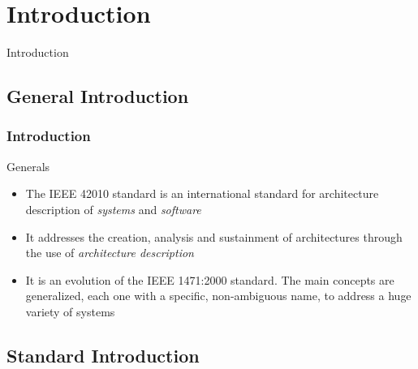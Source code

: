 \footnotesize

\section{Introduction}

	\begin{frame}
		\begin{center}
			\LARGE{Introduction}
		\end{center}
	\end{frame}

	\subsection{General Introduction}
		
		\begin{frame}
			\frametitle{Introduction}	
			\begin{block}{Generals}
				\begin{itemize}\vspace{0.3cm}
					\item The IEEE 42010 standard is an international standard for architecture description of \emph{systems} and \emph{software}\vspace{0.3cm}
					\item It addresses the creation, analysis and sustainment of architectures through the use of \emph{architecture description}\vspace{0.3cm}
					\item It is an evolution of the IEEE 1471:2000 standard. The main concepts are generalized, each one with a specific, non-ambiguous name, to address a huge variety of systems\vspace{0.3cm}
				\end{itemize}
			\end{block}					
		\end{frame}
	
	\subsection{Standard Introduction}	
	
